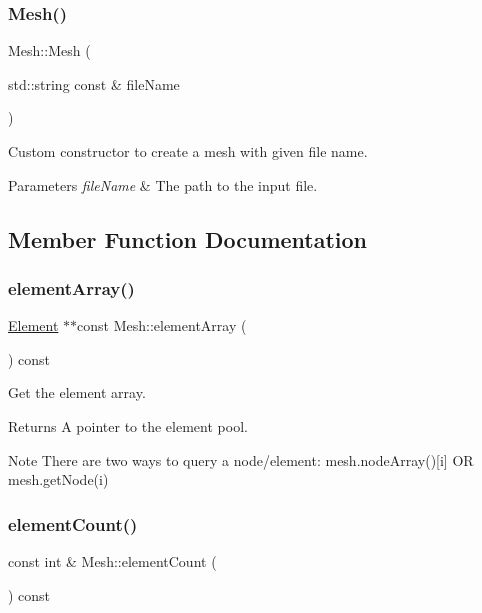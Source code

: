 \subsubsection{\texorpdfstring{Mesh()}{Mesh()}}
{\footnotesize\ttfamily Mesh\+::\+Mesh (\begin{DoxyParamCaption}\item[{std\+::string const \&}]{file\+Name }\end{DoxyParamCaption})}



Custom constructor to create a mesh with given file name. 


\begin{DoxyParams}{Parameters}
{\em file\+Name} & The path to the input file. \\
\hline
\end{DoxyParams}


\subsection{Member Function Documentation}
\mbox{\label{class_mesh_a042cc2ef19b7090f830b915721818181}} 
\subsubsection{\texorpdfstring{element\+Array()}{elementArray()}}
{\footnotesize\ttfamily \mbox{\hyperlink{class_element}{Element}} $\ast$$\ast$const Mesh\+::element\+Array (\begin{DoxyParamCaption}{ }\end{DoxyParamCaption}) const}



Get the element array. 

\begin{DoxyReturn}{Returns}
A pointer to the element pool.
\end{DoxyReturn}
\begin{DoxyNote}{Note}
There are two ways to query a node/element\+: mesh.\+node\+Array()\mbox{[}i\mbox{]} OR mesh.\+get\+Node(i) 
\end{DoxyNote}
\mbox{\label{class_mesh_aa1b2aafa40bd4b335e9bf6306e482881}} 
\subsubsection{\texorpdfstring{element\+Count()}{elementCount()}}
{\footnotesize\ttfamily const int \& Mesh\+::element\+Count (\begin{DoxyParamCaption}{ }\end{DoxyParamCaption}) const}



